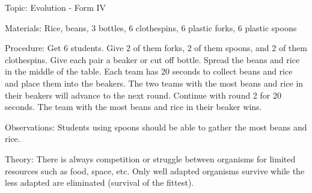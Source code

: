 \begin{multicols}{2}
\begin{description*}
\item[Topic:]{Evolution - Form IV}
\item[Materials:]{Rice, beans, 3 bottles, 6 clothespins, 6 plastic forks, 6 plastic spoons}
\item[Procedure:]{Get 6 students. Give 2 of them forks, 2 of them spoons, and 2 of them clothespins. Give each pair a beaker or cut off bottle. Spread the beans and rice in the middle of the table. Each team has 20 seconds to collect beans and rice and place them into the beakers. The two teams with the most beans and rice in their beakers will advance to the next round. Continue with round 2 for 20 seconds. The team with the most beans and rice in their beaker wins.}
\item[Observations:]{Students using spoons should be able to gather the most beans and rice.}
\item[Theory:]{There is always competition or struggle between organisms for limited resources such as food, space, etc. Only well adapted organisms survive while the less adapted are eliminated (survival of the fittest).}
\end{description*}



\end{multicols}
